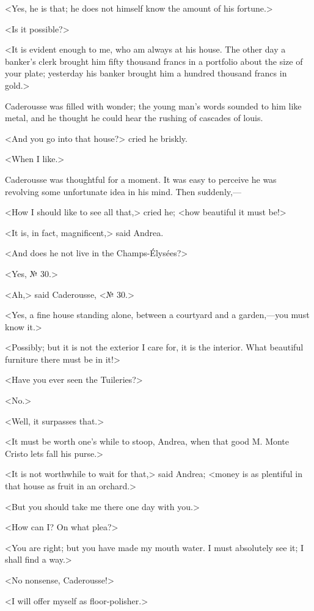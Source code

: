  <Yes, he is that; he does not himself know the amount of his fortune.> 

 <Is it possible?> 

 <It is evident enough to me, who am always at his house. The other day a banker's clerk brought him fifty thousand francs in a portfolio about the size of your plate; yesterday his banker brought him a hundred thousand francs in gold.> 

 Caderousse was filled with wonder; the young man's words sounded to him like metal, and he thought he could hear the rushing of cascades of louis. 

 <And you go into that house?> cried he briskly. 

 <When I like.> 

 Caderousse was thoughtful for a moment. It was easy to perceive he was revolving some unfortunate idea in his mind. Then suddenly,— 

 <How I should like to see all that,> cried he; <how beautiful it must be!> 

 <It is, in fact, magnificent,> said Andrea. 

 <And does he not live in the Champs-Élysées?> 

 <Yes, № 30.> 

 <Ah,> said Caderousse, <№ 30.> 

 <Yes, a fine house standing alone, between a courtyard and a garden,—you must know it.> 

 <Possibly; but it is not the exterior I care for, it is the interior. What beautiful furniture there must be in it!> 

 <Have you ever seen the Tuileries?> 

 <No.> 

 <Well, it surpasses that.> 

 <It must be worth one's while to stoop, Andrea, when that good M. Monte Cristo lets fall his purse.> 

 <It is not worthwhile to wait for that,> said Andrea; <money is as plentiful in that house as fruit in an orchard.> 

 <But you should take me there one day with you.> 

 <How can I? On what plea?> 

 <You are right; but you have made my mouth water. I must absolutely see it; I shall find a way.> 

 <No nonsense, Caderousse!> 

 <I will offer myself as floor-polisher.> 

